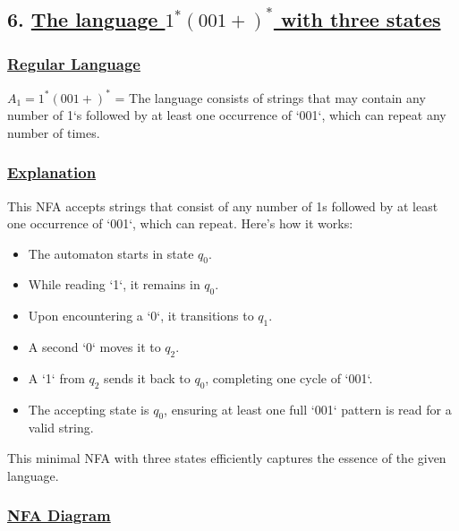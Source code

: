 \documentclass[12pt]{article}
\begin{document}
	\newpage
	\subsection*{6. \underline{The language $1^*(001+)^*$ with three states} } 
	\vspace{2mm} 
	
	\subsubsection*{\underline{Regular Language}} 
	\begin{tcolorbox}[colback=white,colframe=transitioncol,arc=0mm] 
		\( A_1 = 1^*(001+)^*\) = The language consists of strings that may contain any number of 1`s followed by at least one occurrence of `001`, which can repeat any number of times.
	\end{tcolorbox} 
	\subsubsection*{\underline{Explanation}} 
	This NFA accepts strings that consist of any number of 1s followed by at least one occurrence of `001`, which can repeat. Here’s how it works:
	\begin{itemize} 
		\item The automaton starts in state $q_0$.
		\item While reading `1`, it remains in $q_0$.
		\item Upon encountering a `0`, it transitions to $q_1$.
		\item A second `0` moves it to $q_2$.
		\item A `1` from $q_2$ sends it back to $q_0$, completing one cycle of `001`.
		\item The accepting state is $q_0$, ensuring at least one full `001` pattern is read for a valid string.
	\end{itemize} 
	This minimal NFA with three states efficiently captures the essence of the given language.
	\subsubsection*{\underline{NFA Diagram}} 
	\begin{center} 
	\end{center} 
	
\end{document}
